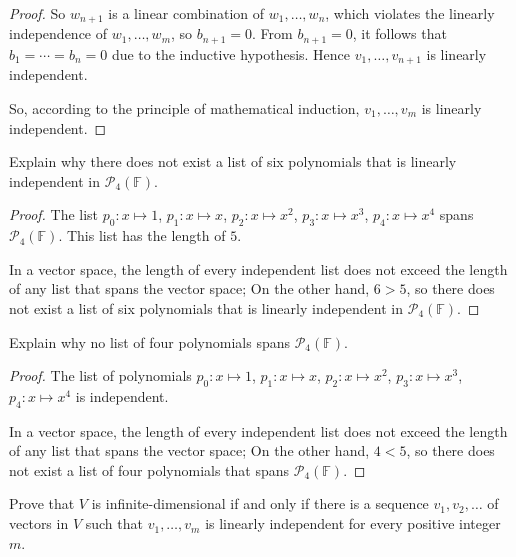 \begin{proof}
    So $w_{n+1}$ is a linear combination of $w_{1}, \ldots, w_{n}$, which violates the linearly independence of $w_{1}, \ldots, w_{m}$, so $b_{n+1} = 0$. From $b_{n+1} = 0$, it follows that $b_{1} = \cdots = b_{n} = 0$ due to the inductive hypothesis. Hence $v_{1}, \ldots, v_{n+1}$ is linearly independent.

    So, according to the principle of mathematical induction, $v_{1}, \ldots, v_{m}$ is linearly independent.
\end{proof}

\begin{exercise}
    Explain why there does not exist a list of six polynomials that is linearly independent in $\mathcal{P}_{4}(\mathbb{F})$.
\end{exercise}

\begin{proof}
    The list $p_{0}: x\mapsto 1$, $p_{1}: x\mapsto x$, $p_{2}: x\mapsto x^{2}$, $p_{3}: x\mapsto x^{3}$, $p_{4}: x\mapsto x^{4}$ spans $\mathcal{P}_{4}(\mathbb{F})$. This list has the length of $5$.

    In a vector space, the length of every independent list does not exceed the length of any list that spans the vector space; On the other hand, $6 > 5$, so there does not exist a list of six polynomials that is linearly independent in $\mathcal{P}_{4}(\mathbb{F})$.
\end{proof}

\begin{exercise}
    Explain why no list of four polynomials spans $\mathcal{P}_{4}(\mathbb{F})$.
\end{exercise}

\begin{proof}
    The list of polynomials $p_{0}: x\mapsto 1$, $p_{1}: x\mapsto x$, $p_{2}: x\mapsto x^{2}$, $p_{3}: x\mapsto x^{3}$, $p_{4}: x\mapsto x^{4}$ is independent.

    In a vector space, the length of every independent list does not exceed the length of any list that spans the vector space; On the other hand, $4 < 5$, so there does not exist a list of four polynomials that spans $\mathcal{P}_{4}(\mathbb{F})$.
\end{proof}

\begin{exercise}\label{chapter2:sectionA:exercise17}
    Prove that $V$ is infinite-dimensional if and only if there is a sequence $v_{1}, v_{2}, \ldots$ of vectors in $V$ such that $v_{1}, \ldots, v_{m}$ is linearly independent for every positive integer $m$.
\end{exercise}


